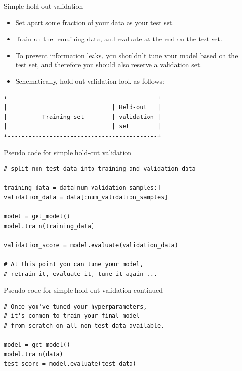 \documentclass{beamer}
\begin{document}
\begin{frame}[fragile]{Simple hold-out validation}
\begin{itemize}
\item Set apart some fraction of your data as your test set.
\item Train on the remaining data, and evaluate at the end on the test set.
\item To prevent information leaks, you shouldn't tune your model based on the test set, and therefore you should also reserve a validation set.
\item Schematically, hold-out validation look as follows:
\end{itemize}
\begin{verbatim}
+-------------------------------------------+
|                              | Held-out   |
|          Training set        | validation |
|                              | set        |
+-------------------------------------------+
\end{verbatim}
\end{frame}

\begin{frame}[fragile]{Pseudo code for simple hold-out validation}
\vspace{-0.75cm}
\begin{lstlisting}
# split non-test data into training and validation data

training_data = data[num_validation_samples:]
validation_data = data[:num_validation_samples]

model = get_model()
model.train(training_data)

validation_score = model.evaluate(validation_data)

# At this point you can tune your model,
# retrain it, evaluate it, tune it again ...
\end{lstlisting}
\end{frame}

%

\begin{frame}[fragile]{Pseudo code for simple hold-out validation continued}
\vspace{-0.75cm}
\begin{lstlisting}
# Once you've tuned your hyperparameters,
# it's common to train your final model
# from scratch on all non-test data available.

model = get_model()
model.train(data)
test_score = model.evaluate(test_data)
\end{lstlisting}
\end{frame}
\end{document}
